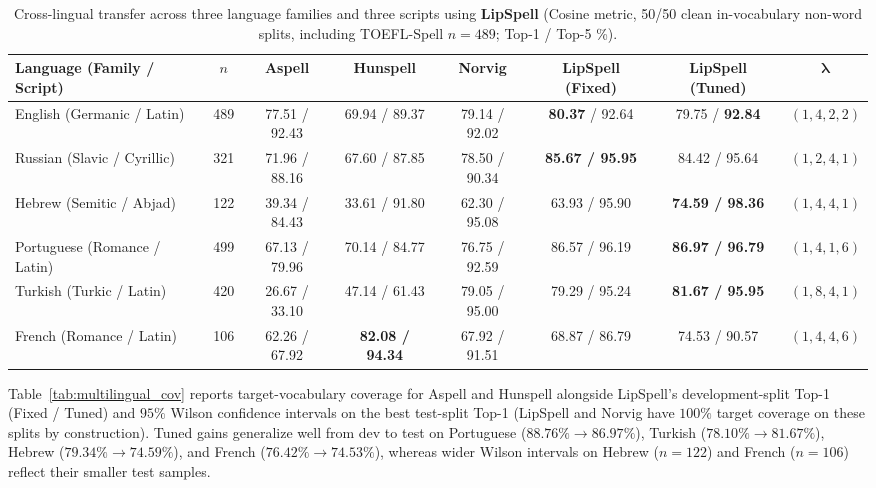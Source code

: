 \documentclass[preprint,12pt,authoryear]{elsarticle}
\begin{document}
\begin{table}[ht]
\centering
\scriptsize
\setlength{\tabcolsep}{2.2pt}
\caption{Cross-lingual transfer across three language families and three scripts using \textbf{LipSpell} (Cosine metric, 50/50 clean in-vocabulary non-word splits, including TOEFL-Spell $n=489$; Top-1 / Top-5 \%).}
\label{tab:multilingual}
\begin{tabular}{lccccccc}
\toprule
Language (Family / Script) & $n$ & Aspell & Hunspell & Norvig & LipSpell (Fixed) & LipSpell (Tuned) & $\boldsymbol{\lambda}$ \\
\midrule
English (Germanic / Latin)   & 489 & 77.51 / 92.43 & 69.94 / 89.37 & 79.14 / 92.02 & \textbf{80.37} / 92.64 & 79.75 / \textbf{92.84} & $(1,4,2,2)$ \\
Russian (Slavic / Cyrillic)  & 321 & 71.96 / 88.16 & 67.60 / 87.85 & 78.50 / 90.34 & \textbf{85.67 / 95.95} & 84.42 / 95.64 & $(1,2,4,1)$ \\
Hebrew (Semitic / Abjad)     & 122 & 39.34 / 84.43 & 33.61 / 91.80 & 62.30 / 95.08 & 63.93 / 95.90 & \textbf{74.59 / 98.36} & $(1,4,4,1)$ \\
Portuguese (Romance / Latin) & 499 & 67.13 / 79.96 & 70.14 / 84.77 & 76.75 / 92.59 & 86.57 / 96.19 & \textbf{86.97 / 96.79} & $(1,4,1,6)$ \\
Turkish (Turkic / Latin)     & 420 & 26.67 / 33.10 & 47.14 / 61.43 & 79.05 / 95.00 & 79.29 / 95.24 & \textbf{81.67 / 95.95} & $(1,8,4,1)$ \\
French (Romance / Latin)     & 106 & 62.26 / 67.92 & \textbf{82.08 / 94.34} & 67.92 / 91.51 & 68.87 / 86.79 & 74.53 / 90.57 & $(1,4,4,6)$ \\
\bottomrule
\end{tabular}
\end{table}

Table~\ref{tab:multilingual_cov} reports target-vocabulary coverage for Aspell and Hunspell alongside LipSpell's development-split Top-1 (Fixed / Tuned) and $95\%$ Wilson confidence intervals on the best test-split Top-1 (LipSpell and Norvig have $100\%$ target coverage on these splits by construction). Tuned gains generalize well from dev to test on Portuguese ($88.76\% \rightarrow 86.97\%$), Turkish ($78.10\% \rightarrow 81.67\%$), Hebrew ($79.34\% \rightarrow 74.59\%$), and French ($76.42\% \rightarrow 74.53\%$), whereas wider Wilson intervals on Hebrew ($n=122$) and French ($n=106$) reflect their smaller test samples.
\end{document}
